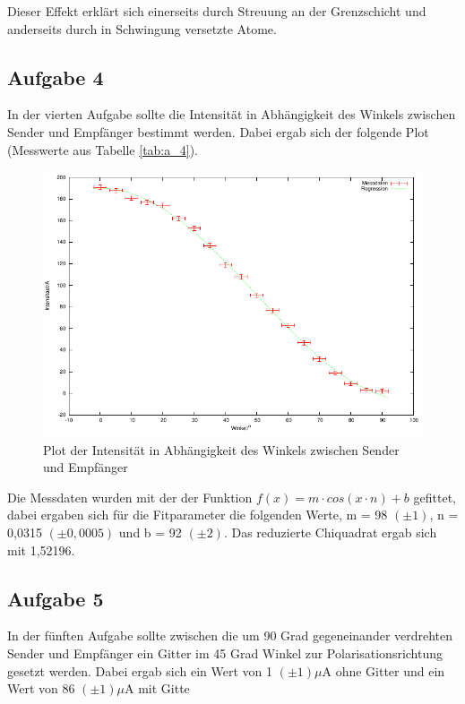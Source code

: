 \documentclass[12pt]{scrartcl}
\begin{document}
Dieser Effekt erklärt sich einerseits durch Streuung an der Grenzschicht und anderseits durch in Schwingung versetzte Atome.

\subsection{Aufgabe 4}
In der vierten Aufgabe sollte die Intensität in Abhängigkeit des Winkels zwischen Sender und Empfänger bestimmt werden. Dabei ergab sich der folgende Plot (Messwerte aus Tabelle \ref{tab:a_4}).

\begin{figure}[H]
\centering
    \includegraphics[scale = 1]{a_4.pdf}
  	\caption[Plot der Intensität in Abhängigkeit des Winkels zwischen Sender und Empfänger]{Plot der Intensität in Abhängigkeit des Winkels zwischen Sender und Empfänger}
  \label{fig:a_4}
\end{figure}

Die Messdaten wurden mit der der Funktion $ f(x) = m \cdot cos(x \cdot n) + b$ gefittet, dabei ergaben sich für die Fitparameter die folgenden Werte, m = 98 $(\pm 1)$, n = 0,0315 $(\pm 0,0005)$ und b = 92 $(\pm 2)$. Das reduzierte Chiquadrat ergab sich mit 1,52196.

\subsection{Aufgabe 5}
In der fünften Aufgabe sollte zwischen die um 90 Grad gegeneinander verdrehten Sender und Empfänger ein Gitter im 45 Grad Winkel zur Polarisationsrichtung gesetzt werden. Dabei ergab sich ein Wert von 1 $(\pm 1) \mu$A ohne Gitter und ein Wert von 86 $(\pm 1) \mu$A mit Gitte
\end{document}
